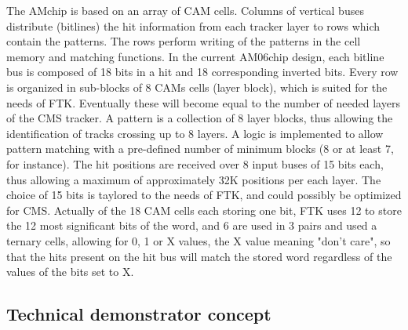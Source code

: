 The AMchip is based on an array of CAM cells. Columns of vertical buses distribute (bitlines) the hit information from each 
tracker layer to rows which contain the patterns. The rows perform writing of the patterns in the cell memory and matching 
functions. In the current AM06chip design, each bitline bus is composed of 18 bits in a hit and 18 corresponding inverted bits.
Every row is organized in sub-blocks of 8 CAMs cells (layer block), which is suited for the needs of FTK. Eventually these
will become equal to the number of needed layers of the CMS tracker. A pattern is a collection of 8 layer blocks, thus allowing
the identification of tracks crossing up to 8 layers. A logic is implemented to allow pattern matching with a pre-defined 
number of minimum blocks (8 or at least 7, for instance). The hit positions are received over 8 input buses of 15 bits each,
thus allowing a maximum of approximately 32K positions per each layer. The choice of 15 bits is taylored to the needs of FTK,
and could possibly be optimized for CMS. Actually of the 18 CAM cells each storing one bit, FTK uses 12 to store the 
12 most significant bits of the word, and 6 are used in 3 pairs and used a ternary cells, allowing for 0, 1 or X values, the 
X value meaning "don't care", so that the hits present on the hit bus will match the stored word regardless of the values
of the bits set to X. 


\subsection{Technical demonstrator concept}


\clearpage
